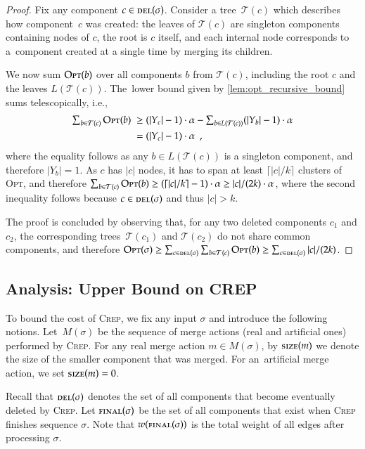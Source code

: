 \documentclass[11pt,a4paper]{scrartcl}
\newcommand{\OPT}{\textsc{Opt}\xspace}
\newcommand{\CREP}{\textsc{Crep}\xspace}
\newcommand{\T}{\mathcal{T}}
\newcommand{\del}{\textsc{del}}
\newcommand{\final}{\textsc{final}}
\newcommand{\size}{\textsc{size}}
\begin{document}
\begin{proof}
Fix any component $c \in \del(\sigma)$. Consider a tree~$\T(c)$ which
describes how component~$c$ was created: the leaves of $\T(c)$ are singleton
components containing nodes of $c$, the root is $c$ itself, and each internal
node corresponds to a~component created at a single time by merging its
children.

We now sum $\OPT(b)$ over all components $b$ from $\T(c)$, including 
the root $c$ and the leaves $L(\T(c))$. The~lower bound given 
by \cref{lem:opt_recursive_bound} sums telescopically, i.e.,
\begin{align*}
	\textstyle \sum_{b \in \T(c)} \OPT(b) \;
		\geq &\; \textstyle (|Y_c|-1) \cdot \alpha - \sum_{b \in L(\T(c))} (|Y_b|-1) \cdot \alpha \\
		= &\; \textstyle (|Y_c|-1) \cdot \alpha 
	\enspace,
\end{align*}
where the equality follows as any $b \in L(\T(c))$ is a singleton component,
and therefore $|Y_b| = 1$. As $c$ has $|c|$ nodes, it has to span at least
$\lceil |c|/k \rceil$ clusters of \OPT, and therefore $\sum_{b \in \T(c)}
\OPT(b) \geq (\lceil |c|/k \rceil -1) \cdot \alpha \geq |c| / (2 k) \cdot
\alpha$, where the second inequality follows because $c \in \del(\sigma)$ and
thus $|c| > k$.

The proof is concluded by observing that, for any two deleted components $c_1$
and $c_2$, the corresponding trees~$\T(c_1)$ and $\T(c_2)$ do not share common
components, and therefore $\OPT(\sigma) \geq \sum_{c \in \del(\sigma)} \sum_{b
\in \T(c)} \OPT(b) \geq \sum_{c \in \del(\sigma)} |c| / (2k)$.
\end{proof}


\subsection{Analysis: Upper Bound on CREP}

To bound the cost of \CREP, we fix any input $\sigma$ and introduce the following 
notions. Let~$M(\sigma)$ be the sequence of merge actions 
(real and artificial ones) performed by \CREP. 
For any real merge action $m \in M(\sigma)$, by
$\size(m)$ we denote the size of the smaller component that was
merged. For an~artificial merge action, we set $\size(m) = 0$.

Recall that $\del(\sigma)$ denotes the 
set of all components that become eventually deleted by \CREP. Let $\final(\sigma)$ 
be the set of all components that exist when \CREP finishes sequence $\sigma$.
Note that $w(\final(\sigma))$ is the total weight of all edges after processing
$\sigma$. 
\end{document}

